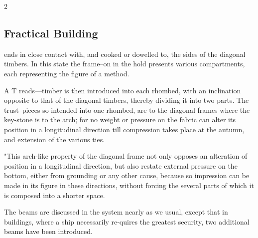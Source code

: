 \documentclass[10pt]{article}
\begin{document}
\begin{multicols}{2}\raggedcolumns
\subsection*{Fractical Building}
ends in close contact with, and cooked or dowelled to, the sides of the diagonal timbers. In this state the frame--on in the hold presents various compartments, each representing the figure of a method.

A T reads—timber is then introduced into each rhombed, with an inclination opposite to that of the diagonal timbers, thereby dividing it into two parts. The trust--pieces so intended into one rhombed, are to the diagonal frames where the key-stone is to the arch; for no weight or pressure on the fabric can alter its position in a longitudinal direction till compression takes place at the autumn, and extension of the various ties.

"This arch-like property of the diagonal frame not only opposes an alteration of position in a longitudinal direction, but also restate external pressure on the bottom, either from grounding or any other cause, because so impression can be made in its figure in these directions, without forcing the several parts of which it is composed into a shorter space.

The beams are discussed in the system nearly as we usual, except that in buildings, where a ship necessarily re-quires the greatest security, two additional beams have been introduced.


\end{multicols}
\end{document}
